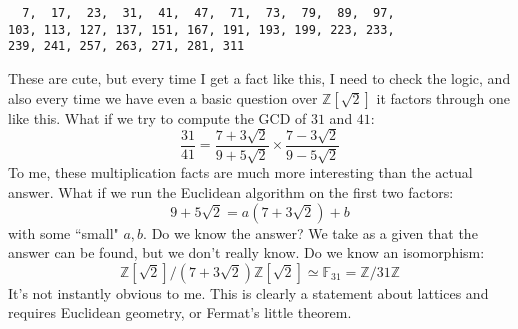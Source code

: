 \documentclass[12pt]{article}
\begin{document}
\begin{verbatim}
  7,  17,  23,  31,  41,  47,  71,  73,  79,  89,  97, 
103, 113, 127, 137, 151, 167, 191, 193, 199, 223, 233, 
239, 241, 257, 263, 271, 281, 311
\end{verbatim}
These are cute, but every time I get a fact like this, I need to check the logic, and also every time we have even a basic question over $\mathbb{Z}[\sqrt{2}]$ it factors through one like this.  What if we try to compute the GCD of $31$ and $41$:
$$ \frac{31}{41} = \frac{7 + 3 \sqrt{2}}{9 + 5 \sqrt{2}}\times
\frac{7 - 3 \sqrt{2}}{9 - 5 \sqrt{2}}$$
To me, these multiplication facts are much more interesting than the actual answer. What if we run the Euclidean algorithm on the first two factors:
$$ 9 + 5 \sqrt{2} 
 = a(7 + 3 \sqrt{2}) + b $$
 with some ``small" $a,b$.  Do we know the answer?  We take as a given that the answer can be found, but we don't really know.  Do we know an isomorphism:
 $$ \mathbb{Z}[\sqrt{2}]/(7 + 3 \sqrt{2})\mathbb{Z}[\sqrt{2}] \simeq \mathbb{F}_{31} = \mathbb{Z}/31 \mathbb{Z} $$
 It's not instantly obvious to me.  This is clearly a statement about lattices and requires Euclidean geometry, or Fermat's little theorem.
\end{document}
